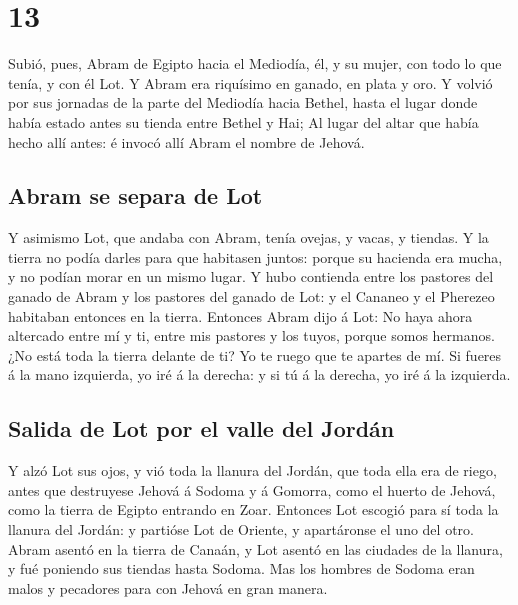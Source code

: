 \hypertarget{section-12}{%
\section{13}\label{section-12}}

 Subió, pues, Abram de Egipto hacia el Mediodía, él, y su
mujer, con todo lo que tenía, y con él Lot.  Y Abram era
riquísimo en ganado, en plata y oro.  Y volvió por sus
jornadas de la parte del Mediodía hacia Bethel, hasta el lugar donde
había estado antes su tienda entre Bethel y Hai;  Al lugar
del altar que había hecho allí antes: é invocó allí Abram el nombre de
Jehová.

\hypertarget{abram-se-separa-de-lot}{%
\subsection{Abram se separa de Lot}\label{abram-se-separa-de-lot}}

 Y asimismo Lot, que andaba con Abram, tenía ovejas, y
vacas, y tiendas.  Y la tierra no podía darles para que
habitasen juntos: porque su hacienda era mucha, y no podían morar en un
mismo lugar.  Y hubo contienda entre los pastores del
ganado de Abram y los pastores del ganado de Lot: y el Cananeo y el
Pherezeo habitaban entonces en la tierra.  Entonces Abram
dijo á Lot: No haya ahora altercado entre mí y ti, entre mis pastores y
los tuyos, porque somos hermanos.  ¿No está toda la tierra
delante de ti? Yo te ruego que te apartes de mí. Si fueres á la mano
izquierda, yo iré á la derecha: y si tú á la derecha, yo iré á la
izquierda.

\hypertarget{salida-de-lot-por-el-valle-del-jorduxe1n}{%
\subsection{Salida de Lot por el valle del
Jordán}\label{salida-de-lot-por-el-valle-del-jorduxe1n}}

 Y alzó Lot sus ojos, y vió toda la llanura del Jordán,
que toda ella era de riego, antes que destruyese Jehová á Sodoma y á
Gomorra, como el huerto de Jehová, como la tierra de Egipto entrando en
Zoar.  Entonces Lot escogió para sí toda la llanura del
Jordán: y partióse Lot de Oriente, y apartáronse el uno del otro.
 Abram asentó en la tierra de Canaán, y Lot asentó en las
ciudades de la llanura, y fué poniendo sus tiendas hasta Sodoma.
 Mas los hombres de Sodoma eran malos y pecadores para
con Jehová en gran manera.

